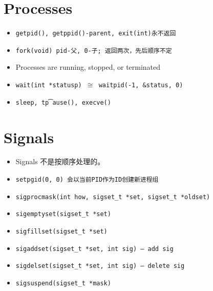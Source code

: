 \section{Processes}
\begin{itemize}[nosep]
    \item \tt{getpid()}, \tt{getppid()}-parent, \tt{exit(int)}永不返回
    \item \tt{fork(void)} pid-父, 0-子; 返回两次，先后顺序不定
    \item Processes are running, stopped, or terminated
    \item \tt{wait(int *statusp)} $\cong$ \tt{waitpid(-1, \&status, 0)}
    \item \tt{sleep}, t\t{pause()}, \tt{execve()}
\end{itemize}



\section{Signals}
\begin{itemize}[nosep]
    \item Signals 不是按顺序处理的。
    \item \tt{setpgid(0, 0)} 会以当前PID作为ID创建新进程组
    \item \tt{sigprocmask(int how, sigset\_t *set, sigset\_t *oldset)}
    \item \tt{sigemptyset(sigset\_t *set)}
    \item \tt{sigfillset(sigset\_t *set)}
    \item \tt{sigaddset(sigset\_t *set, int sig)} -- add \tt{sig}
    \item \tt{sigdelset(sigset\_t *set, int sig)} -- delete \tt{sig}
    \item \tt{sigsuspend(sigset\_t *mask)}
\end{itemize}
